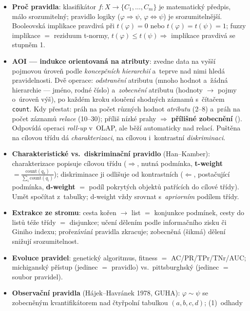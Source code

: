 \documentclass[11pt,a4paper]{article}
\theoremstyle{definition}
\begin{document}
\begin{itemize}
\item \textbf{Proč pravidla}: klasifikátor $f\colon X\to\{C_1,\dots,C_m\}$ je
      matematický předpis, málo srozumitelný; pravidlo logiky
      ($\varphi\Rightarrow\psi$, $\varphi\Leftrightarrow\psi$) je srozumitelnější.
      Booleovská implikace pravdivá při $t(\varphi)=0$ nebo $t(\varphi)=t(\psi)=1$;
      fuzzy implikace $=$ reziduum t-normy, $t(\varphi)\le t(\psi)\Rightarrow$
      implikace pravdivá se stupněm 1.
\item \textbf{AOI --- indukce orientovaná na atributy}: zvedne data na vyšší pojmovou
      úroveň podle \emph{koncepčních hierarchií} a~teprve nad nimi hledá pravidelnosti.
      Dvě operace: \emph{odstranění} atributu (mnoho hodnot a~žádná hierarchie --- jméno,
      rodné číslo) a~\emph{zobecnění} atributu (hodnoty $\to$ pojmy o~úroveň výš), po
      každém kroku sloučení shodných záznamů s~čítačem \texttt{count}. Kdy přestat: práh
      na počet různých hodnot \emph{atributu} (2--8) a~práh na počet záznamů \emph{relace}
      (10--30); příliš nízké prahy $\Rightarrow$ \textbf{přílišné zobecnění}
      (). Odpovídá operaci \emph{roll-up} v~OLAP, ale běží
      automaticky nad relací. Puštěna na cílovou třídu dá \emph{charakterizaci}, na
      cílovou i~kontrastní \emph{diskriminaci}.
\item \textbf{Charakteristické vs.\ diskriminační pravidlo} (Han--Kamber):
      charakterizace popisuje cílovou třídu ($\Rightarrow$, nutná podmínka,
      \textbf{t-weight} $=\frac{\mathrm{count}(q_a)}{\sum_i\mathrm{count}(q_i)}$);
      diskriminace ji odlišuje od kontrastních ($\Leftarrow$, postačující podmínka,
      \textbf{d-weight} $=$ podíl pokrytých objektů patřících do cílové třídy). Umět
      spočítat z~tabulky; d-weight vždy srovnat s~\emph{apriorním} podílem třídy.
\item \textbf{Extrakce ze stromu}: cesta kořen $\to$ list $=$ konjunkce podmínek, cesty
      do listů téže třídy $=$ disjunkce; učení dělením podle informačního zisku či
      Giniho indexu; prořezávání pravidla zkracuje; zobecněná (šikmá) dělení snižují
      srozumitelnost.
\item \textbf{Evoluce pravidel}: genetický algoritmus, fitness $=$ AC/PR/TPr/TNr/AUC;
      michiganský přístup (jedinec $=$ pravidlo) vs.\ pittsburghský (jedinec $=$ soubor
      pravidel).
\item \textbf{Observační pravidla} (Hájek--Havránek 1978, GUHA): $\varphi\sim\psi$ se
      zobecněným kvantifikátorem nad čtyřpolní tabulkou $(a,b,c,d)$; (1)~odhady

\end{itemize}
\end{document}
